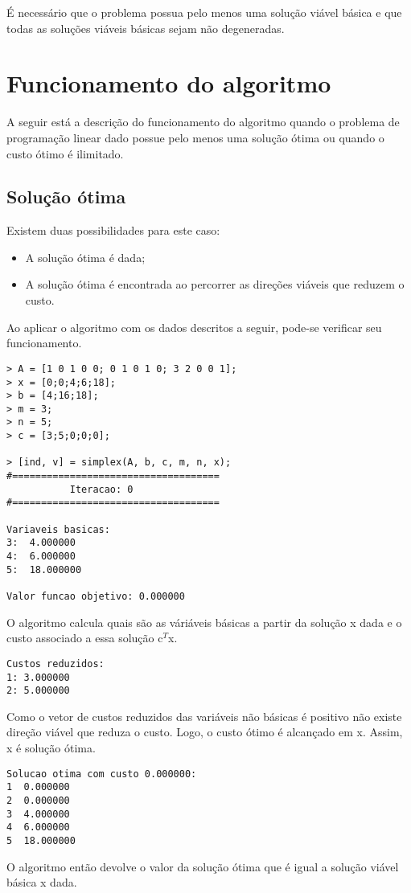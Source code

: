 \documentclass[
	12pt,				%
	openright,			%
	oneside,			%
	a4paper,			%
	english,			%
	french,				%
	spanish,			%
	brazil,				%
	]{abntex2}
\begin{document}
É necessário que o problema possua pelo menos uma solução viável básica e que todas as soluções viáveis básicas sejam não degeneradas.

\chapter{Funcionamento do algoritmo}

A seguir está a descrição do funcionamento do algoritmo quando o problema de
programação linear dado possue pelo menos uma solução ótima ou quando o custo 
ótimo é ilimitado.

\section{Solução ótima}

Existem duas possibilidades para este caso: 
\begin{itemize}
\item A solução ótima é dada;
\item A solução ótima é encontrada ao percorrer as direções viáveis que reduzem o custo.
\end{itemize}


Ao aplicar o algoritmo com os dados descritos a seguir, pode-se verificar seu funcionamento.
\begin{verbatim}
> A = [1 0 1 0 0; 0 1 0 1 0; 3 2 0 0 1];
> x = [0;0;4;6;18];
> b = [4;16;18];
> m = 3;
> n = 5;
> c = [3;5;0;0;0];

> [ind, v] = simplex(A, b, c, m, n, x);
#====================================
           Iteracao: 0
#====================================

Variaveis basicas:
3:  4.000000
4:  6.000000
5:  18.000000

Valor funcao objetivo: 0.000000
\end{verbatim}

O algoritmo calcula quais são as váriáveis básicas a partir da solução x dada e o custo associado a essa solução c$^T$x.

\begin{verbatim}
Custos reduzidos:
1: 3.000000
2: 5.000000
\end{verbatim}

Como o vetor de custos reduzidos das variáveis não básicas é positivo não existe direção viável que reduza o custo. Logo, o custo ótimo é alcançado em x. Assim, x é solução ótima.

\begin{verbatim}
Solucao otima com custo 0.000000:
1  0.000000
2  0.000000
3  4.000000
4  6.000000
5  18.000000
\end{verbatim}
O algoritmo então devolve o valor da solução ótima que é igual a solução viável básica x dada.
\end{document}
